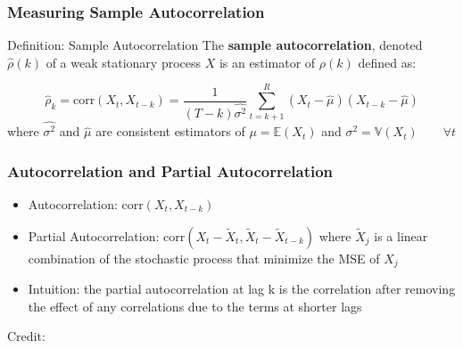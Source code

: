 \documentclass{beamer}
\begin{document}
\begin{frame}
  \frametitle{Measuring Sample Autocorrelation}
  \begin{block}{Definition: Sample Autocorrelation}
    The \textbf{sample autocorrelation}, denoted $\hat{\rho}(k)$ of a weak stationary process $X$ is an estimator of $\rho(k)$ defined as:

    \begin{equation*} 
      \hat{\rho}_k = \text{corr}(X_t, X_{t-k}) = \frac{1}{(T-k)\hat{\sigma^2}} \sum_{t=k+1}^{R}(X_t - \hat{\mu})(X_{t-k} - \hat{\mu})
    \end{equation*}
where $\hat{\sigma^2}$ and $\hat{\mu}$ are consistent estimators of $\mu = \mathbb{E}(X_t)$ and $\sigma^2 = \mathbb{V}(X_t) \qquad \forall t$
  \end{block}
\end{frame}



\begin{frame}
  \frametitle{Autocorrelation and Partial Autocorrelation}

  \begin{itemize}
  \item Autocorrelation: $\text{corr}(X_t, X_{t-k})$
  \item Partial Autocorrelation: $\text{corr}(X_t - \tilde{X}_{t}, \tilde{X}_t - \tilde{X}_{t-k})$ where $\tilde{X}_{j}$ is a linear combination of the stochastic process that minimize the MSE of $X_{j}$
  \item Intuition: the partial autocorrelation at lag k is the correlation after removing the effect of any correlations due to the terms at shorter lags
  \end{itemize}
  
  \hspace*{15pt}\hbox{\scriptsize Credit:} 
\end{frame}
\end{document}
